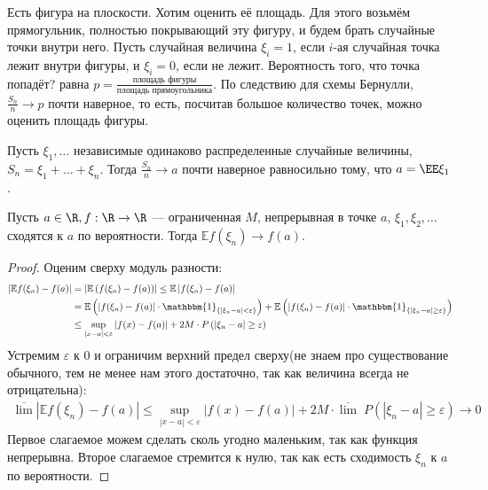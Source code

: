  \begin{example}
     Есть фигура на плоскости. Хотим оценить её площадь. Для этого возьмём прямогульник, полностью покрывающий эту фигуру, и будем брать случайные точки внутри него. Пусть случайная величина $\xi_i = 1$, если $i$-ая случайная точка лежит внутри фигуры, и $\xi_i = 0$, если не лежит. Вероятность того, что точка попадёт? равна
     $p = \frac{\text{площадь фигуры}}{\text{площадь прямоугольника}}$.
    По следствию для схемы Бернулли, $\frac{S_n}{n}\rightarrow p$ почти наверное, то есть, посчитав большое количество точек, можно оценить площадь фигуры.
 \end{example}

 \begin{theorem} 
    Пусть $\xi_1, \ldots$ независимые одинаково распределенные случайные величины,
     $S_n = \xi_1 + \ldots + \xi_n$. Тогда $\frac{S_n}{n}\rightarrow a$ почти наверное равносильно тому, что $a=\EE \xi_1$.
 \end{theorem}
 
 \begin{theorem}
    Пусть $a \in \R, f : \R \to \R$ --- ограниченная $M$, непрерывная в точке $a$, $\xi_1, \xi_2, \dotsc$ сходятся к $a$ по вероятности. Тогда $\mathbb{E} f(\xi_n) \to f(a)$.
 \end{theorem}
 \begin{proof}
     Оценим сверху модуль разности:
     \begin{align*}
         \left | \mathbb{E} f(\xi_n) - f(a) \right | 
         &= \left | \mathbb{E} \left( f(\xi_n) - f(a) \right ) \right | \leq
         \mathbb{E} \left | f(\xi_n) - f(a) \right |  \\
         &= \mathbb{E} \left ( | f(\xi_n) - f(a) | \cdot \mathbbm{1}_{\{|\xi_n - a | < \varepsilon\}} \right )
         + \mathbb{E} \left ( | f(\xi_n) - f(a) | \cdot \mathbbm{1}_{\{|\xi_n - a| \geq \varepsilon\}} \right ) \\
         &\leq \sup\limits_{|x - a| < \varepsilon} | f(x) - f(a) | + 2M \cdot P \left ( |  \xi_n - a | \geq \varepsilon \right)
     \end{align*}
     Устремим $\varepsilon$ к 0 и ограничим верхний предел сверху(не знаем про существование обычного, тем не менее нам этого достаточно, так как величина всегда не отрицательна):
     \begin{align*}
         \overline{\lim} \left | \mathbb{E} f(\xi_n) - f(a) \right | \leq 
         \sup\limits_{|x - a| < \varepsilon} | f(x) - f(a)| +
         2M \cdot \overline{\lim} \; P(|\xi_n - a| \geq \varepsilon) \to 0
     \end{align*}
     Первое слагаемое можем сделать сколь угодно маленьким, так как функция непрерывна. Второе слагаемое стремится к нулю, так как есть сходимость $\xi_n$ к $a$ по вероятности.
 \end{proof}
 
